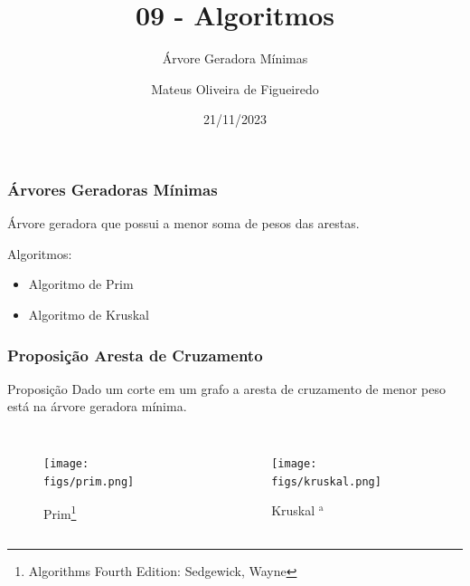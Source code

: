 \documentclass[aspectratio=169,usenames,dvipsnames]{beamer}
\title{09 - Algoritmos}
\subtitle{Árvore Geradora Mínimas}
\author{Mateus Oliveira de Figueiredo}
\date{21/11/2023}
\begin{document}
\begin{frame}
\titlepage
\end{frame}

\begin{frame}
\frametitle{Árvores Geradoras Mínimas}

Árvore geradora que possui a menor soma de pesos das arestas.

\vfill
Algoritmos:
\begin{itemize}
  \item Algoritmo de Prim
  \item Algoritmo de Kruskal
\end{itemize}
\vfill
\end{frame}


\begin{frame}
\frametitle{Proposição Aresta de Cruzamento}

\vfill
\begin{block}{Proposição}
    Dado um corte em um grafo a aresta de cruzamento de menor peso está na árvore geradora mínima.
\end{block}
\vfill

\begin{columns}

\begin{figure}[ht]
\centering
\texttt{[image: figs/prim.png]}
\caption{Prim\footnote{Algorithms Fourth Edition: Sedgewick, Wayne}}
\end{figure}

\begin{figure}[ht]
\centering
\texttt{[image: figs/kruskal.png]}
\caption{Kruskal $^\text{a}$}
\end{figure}
\end{columns}
\vfill



\end{frame}
\end{document}
